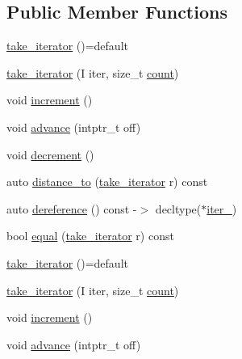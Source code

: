 \subsection*{Public Member Functions}
\begin{DoxyCompactItemize}
\item 
\mbox{\hyperlink{structrah_1_1view_1_1take__iterator_a0df2b333ea2a0deb3db7c84d12ebbaca}{take\+\_\+iterator}} ()=default
\item 
\mbox{\hyperlink{structrah_1_1view_1_1take__iterator_ad818949f1227e0676a9c1ad35860cf46}{take\+\_\+iterator}} (I iter, size\+\_\+t \mbox{\hyperlink{namespacerah_aa528865cc4a45d4eb276329554f16b4b}{count}})
\item 
void \mbox{\hyperlink{structrah_1_1view_1_1take__iterator_a5a1663517c2525b6cd6ed27f82047ba8}{increment}} ()
\item 
void \mbox{\hyperlink{structrah_1_1view_1_1take__iterator_a55e1c95489b33de8006af33b9511fb28}{advance}} (intptr\+\_\+t off)
\item 
void \mbox{\hyperlink{structrah_1_1view_1_1take__iterator_a8f956fdfee282abbd88100533033d648}{decrement}} ()
\item 
auto \mbox{\hyperlink{structrah_1_1view_1_1take__iterator_a6516d99883863b621df6717bf1d4613b}{distance\+\_\+to}} (\mbox{\hyperlink{structrah_1_1view_1_1take__iterator}{take\+\_\+iterator}} r) const
\item 
auto \mbox{\hyperlink{structrah_1_1view_1_1take__iterator_af6fe7bae848e71f68dcdf12565db2c52}{dereference}} () const -\/$>$ decltype($\ast$\mbox{\hyperlink{structrah_1_1view_1_1take__iterator_abbc947797abfa6ecaeb91c8185212152}{iter\+\_\+}})
\item 
bool \mbox{\hyperlink{structrah_1_1view_1_1take__iterator_a222e31de32a4780e1f0f0f6d9d963ded}{equal}} (\mbox{\hyperlink{structrah_1_1view_1_1take__iterator}{take\+\_\+iterator}} r) const
\item 
\mbox{\hyperlink{structrah_1_1view_1_1take__iterator_a0df2b333ea2a0deb3db7c84d12ebbaca}{take\+\_\+iterator}} ()=default
\item 
\mbox{\hyperlink{structrah_1_1view_1_1take__iterator_ad818949f1227e0676a9c1ad35860cf46}{take\+\_\+iterator}} (I iter, size\+\_\+t \mbox{\hyperlink{namespacerah_aa528865cc4a45d4eb276329554f16b4b}{count}})
\item 
void \mbox{\hyperlink{structrah_1_1view_1_1take__iterator_a5a1663517c2525b6cd6ed27f82047ba8}{increment}} ()
\item 
void \mbox{\hyperlink{structrah_1_1view_1_1take__iterator_a55e1c95489b33de8006af33b9511fb28}{advance}} (intptr\+\_\+t off)

\end{DoxyCompactItemize}
